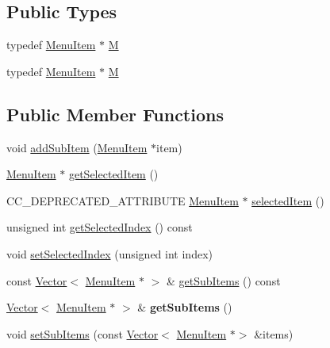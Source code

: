 \subsection*{Public Types}
\begin{DoxyCompactItemize}
\item 
typedef \hyperlink{classMenuItem}{Menu\+Item} $\ast$ \hyperlink{classMenuItemToggle_a4f44d80e256ed59e1994b4a04f009903}{M}
\item 
typedef \hyperlink{classMenuItem}{Menu\+Item} $\ast$ \hyperlink{classMenuItemToggle_a4f44d80e256ed59e1994b4a04f009903}{M}
\end{DoxyCompactItemize}
\subsection*{Public Member Functions}
\begin{DoxyCompactItemize}
\item 
void \hyperlink{classMenuItemToggle_a6aa25743d0b1e4ad143dbde655c65fdb}{add\+Sub\+Item} (\hyperlink{classMenuItem}{Menu\+Item} $\ast$item)
\item 
\hyperlink{classMenuItem}{Menu\+Item} $\ast$ \hyperlink{classMenuItemToggle_a677a837ba57326e55d8baa8e725f905a}{get\+Selected\+Item} ()
\item 
C\+C\+\_\+\+D\+E\+P\+R\+E\+C\+A\+T\+E\+D\+\_\+\+A\+T\+T\+R\+I\+B\+U\+TE \hyperlink{classMenuItem}{Menu\+Item} $\ast$ \hyperlink{classMenuItemToggle_a290e987c2bf2190b9aac3287617d4e9d}{selected\+Item} ()
\item 
unsigned int \hyperlink{classMenuItemToggle_a1483b8a73150e59df0c9aaa9194beba0}{get\+Selected\+Index} () const
\item 
void \hyperlink{classMenuItemToggle_af3303da9456dd04fc6e212c57c547f53}{set\+Selected\+Index} (unsigned int index)
\item 
const \hyperlink{classVector}{Vector}$<$ \hyperlink{classMenuItem}{Menu\+Item} $\ast$ $>$ \& \hyperlink{classMenuItemToggle_a4c88c2253e670a50f8d4eef511ed51fd}{get\+Sub\+Items} () const
\item 
\mbox{\label{classMenuItemToggle_acf9c5de4a6ace417c5b3e6ec1651d343}} 
\hyperlink{classVector}{Vector}$<$ \hyperlink{classMenuItem}{Menu\+Item} $\ast$ $>$ \& {\bfseries get\+Sub\+Items} ()
\item 
void \hyperlink{classMenuItemToggle_adf096428e8dce43a7e2870a8dc2d62fb}{set\+Sub\+Items} (const \hyperlink{classVector}{Vector}$<$ \hyperlink{classMenuItem}{Menu\+Item} $\ast$$>$ \&items)
$$
\end{DoxyCompactItemize}
